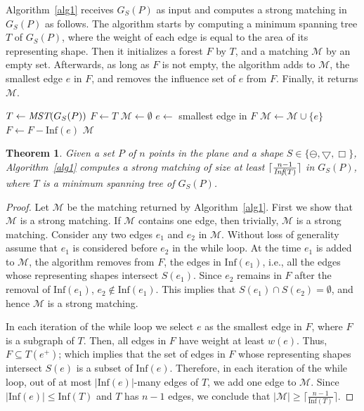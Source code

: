 \documentclass[11pt,a4paper]{article}
\newcommand{\MST}{\text{\em MST}}
\newcommand{\SMGG}{\text{\em Strong-matching}}
\newcommand{\emin}{e}
\newcommand{\G}[2]{G_{#1}({#2})}
\newcommand{\Inf}[1]{\text{Inf}(#1)}
\newcommand{\ddisc}{\ominus}
\newcommand{\sqr}{\Box}
\newcommand{\trid}{\bigtriangledown}
\newtheorem{theorem}{Theorem}
\begin{document}
Algorithm~\ref{alg1} receives $\G{S}{P}$ as input and computes a strong matching in $\G{S}{P}$ as follows. The algorithm starts by computing a minimum spanning tree $T$ of $\G{S}{P}$, where the weight of each edge is equal to the area of its representing shape. Then it initializes a forest $F$ by $T$, and a matching $\mathcal{M}$ by an empty set. Afterwards, as long as $F$ is not empty, the algorithm adds to $\mathcal{M}$, the smallest edge $\emin$ in $F$, and removes the influence set of $e$ from $F$. Finally, it returns $\mathcal{M}$.
\begin{algorithm}                      \caption{\SMGG$(\G{S}{P})$}          \label{alg1} 
\begin{algorithmic}[1]
\State $T\gets \MST(G_S(P))$
      \State $F\gets T$
      \State $\mathcal{M}\gets \emptyset$
	  \State $\emin\gets $ smallest edge in $F$
\State $\mathcal{M}\gets \mathcal{M}\cup \{\emin\}$
	  \State $F\gets F - \Inf{\emin}$
	  \EndWhile
    \State \Return $\mathcal{M}$
\end{algorithmic}
\end{algorithm}
\begin{theorem}
\label{GS-thr}
Given a set $P$ of $n$ points in the plane and a shape $S\in\{\ddisc, \trid, \sqr\}$, Algorithm~\ref{alg1} computes a strong matching of size at least $\lceil\frac{n-1}{\emph{Inf}(T)}\rceil$ in $\G{S}{P}$, where $T$ is a minimum spanning tree of $\G{S}{P}$. 
\end{theorem}
\begin{proof}
Let $\mathcal{M}$ be the matching returned by Algorithm~\ref{alg1}. First we show that $\mathcal{M}$ is a strong matching. If $\mathcal{M}$ contains one edge, then trivially, $\mathcal{M}$ is a strong matching. Consider any two edges $e_1$ and $e_2$ in $\mathcal{M}$. Without loss of generality assume that $e_1$ is considered before $e_2$ in the {\sf while} loop. At the time $e_1$ is added to $\mathcal{M}$, the algorithm removes from $F$, the edges in $\Inf{e_1}$, i.e., all the edges whose representing shapes intersect $S(e_1)$. Since $e_2$ remains in $F$ after the removal of $\Inf{e_1}$, $e_2\notin\Inf{e_1}$. This implies that $S(e_1)\cap S(e_2)=\emptyset$, and hence $\mathcal{M}$ is a strong matching.

In each iteration of the {\sf while} loop we select $\emin$ as the smallest edge in $F$, where $F$ is a subgraph of $T$. Then, all edges in $F$ have weight at least $w(e)$. Thus, $F\subseteq T(\emin^+)$; which implies that the set of edges in $F$ whose representing shapes intersect $S(\emin)$ is a subset of $\Inf{\emin}$. Therefore, in each iteration of the {\sf while} loop, out of at most $|\Inf{e}|$-many edges of $T$, we add one edge to $\mathcal{M}$. Since $|\Inf{\emin}|\le \Inf{T}$ and $T$ has $n-1$ edges, we conclude that $|\mathcal{M}|\ge\lceil\frac{n-1}{\Inf{T}}\rceil$.
\end{proof}
\end{document}
